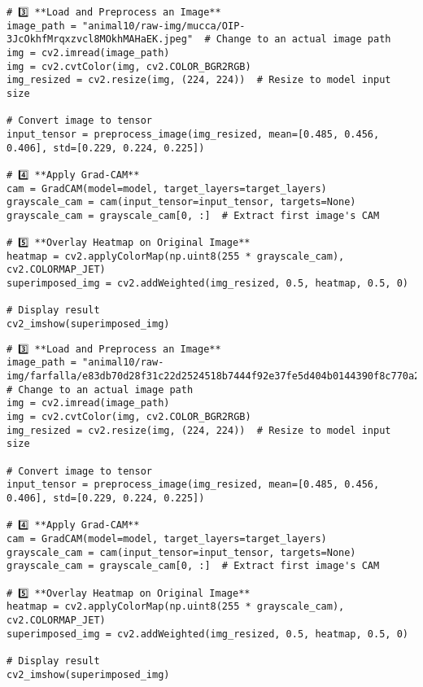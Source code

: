 \documentclass{article}
\begin{document}
\begin{verbatim}
# 3️⃣ **Load and Preprocess an Image**
image_path = "animal10/raw-img/mucca/OIP-3JcOkhfMrqxzvcl8MOkhMAHaEK.jpeg"  # Change to an actual image path
img = cv2.imread(image_path)
img = cv2.cvtColor(img, cv2.COLOR_BGR2RGB)
img_resized = cv2.resize(img, (224, 224))  # Resize to model input size

# Convert image to tensor
input_tensor = preprocess_image(img_resized, mean=[0.485, 0.456, 0.406], std=[0.229, 0.224, 0.225])

# 4️⃣ **Apply Grad-CAM**
cam = GradCAM(model=model, target_layers=target_layers)
grayscale_cam = cam(input_tensor=input_tensor, targets=None)
grayscale_cam = grayscale_cam[0, :]  # Extract first image's CAM

# 5️⃣ **Overlay Heatmap on Original Image**
heatmap = cv2.applyColorMap(np.uint8(255 * grayscale_cam), cv2.COLORMAP_JET)
superimposed_img = cv2.addWeighted(img_resized, 0.5, heatmap, 0.5, 0)

# Display result
cv2_imshow(superimposed_img)
\end{verbatim}

\begin{verbatim}
# 3️⃣ **Load and Preprocess an Image**
image_path = "animal10/raw-img/farfalla/e83db70d28f31c22d2524518b7444f92e37fe5d404b0144390f8c770a2e9b5_640.jpg"  # Change to an actual image path
img = cv2.imread(image_path)
img = cv2.cvtColor(img, cv2.COLOR_BGR2RGB)
img_resized = cv2.resize(img, (224, 224))  # Resize to model input size

# Convert image to tensor
input_tensor = preprocess_image(img_resized, mean=[0.485, 0.456, 0.406], std=[0.229, 0.224, 0.225])

# 4️⃣ **Apply Grad-CAM**
cam = GradCAM(model=model, target_layers=target_layers)
grayscale_cam = cam(input_tensor=input_tensor, targets=None)
grayscale_cam = grayscale_cam[0, :]  # Extract first image's CAM

# 5️⃣ **Overlay Heatmap on Original Image**
heatmap = cv2.applyColorMap(np.uint8(255 * grayscale_cam), cv2.COLORMAP_JET)
superimposed_img = cv2.addWeighted(img_resized, 0.5, heatmap, 0.5, 0)

# Display result
cv2_imshow(superimposed_img)
\end{verbatim}
\end{document}
